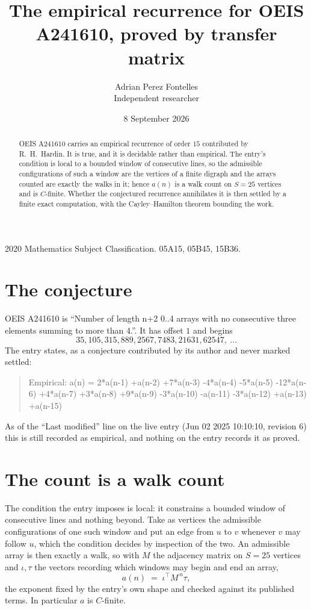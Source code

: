 \documentclass[11pt,a4paper]{article}
\title{The empirical recurrence for OEIS A241610, proved by transfer matrix}
\author{Adrian Perez Fontelles\\ \small Independent researcher}
\date{8 September 2026}
\theoremstyle{plain}
\theoremstyle{definition}
\begin{document}
\maketitle

\begin{abstract}
OEIS A241610 carries an empirical recurrence of order $15$ contributed by R.~H.~Hardin. It is
true, and it is decidable rather than empirical. The entry's condition is local to a bounded window of consecutive lines, so
the admissible configurations of such a window are the vertices of a finite digraph and the
arrays counted are exactly the walks in it; hence $a(n)$ is a walk count on $S=25$ vertices
and is $C$-finite. Whether the conjectured recurrence annihilates it is then settled by a
finite exact computation, with the Cayley--Hamilton theorem bounding the work.
\end{abstract}

\noindent\small 2020 Mathematics Subject Classification. 05A15, 05B45, 15B36.\normalsize

\section{The conjecture}

OEIS A241610 is ``Number of length n+2 0..4 arrays with no consecutive three elements summing to more than 4.''. It has offset $1$ and begins
\[
35, 105, 315, 889, 2567, 7483, 21631, 62547,\ \dots
\]
The entry states, as a conjecture contributed by its author and never marked settled:
\begin{quote}
Empirical: a(n) = 2*a(n-1) +a(n-2) +7*a(n-3) -4*a(n-4) -5*a(n-5) -12*a(n-6) +4*a(n-7) +3*a(n-8) +9*a(n-9) -3*a(n-10) -a(n-11) -3*a(n-12) +a(n-13) +a(n-15)
\end{quote}
As of the ``Last modified'' line on the live entry (Jun 02 2025 10:10:10, revision 6) this is still
recorded as empirical, and nothing on the entry records it as proved.

\section{The count is a walk count}

The condition the entry imposes is local: it constrains a bounded window of consecutive lines and nothing beyond. Take as
vertices the admissible configurations of one such window and put an edge from $u$ to $v$
whenever $v$ may follow $u$, which the condition decides by inspection of the two. An
admissible array is then exactly a walk, so with $M$ the adjacency matrix on $S=25$ vertices
and $\iota,\tau$ the vectors recording which windows may begin and end an array,
\[
a(n)\;=\;\iota^{\!\top}M^{\,n}\tau ,
\]
the exponent fixed by the entry's own shape and checked against its published terms. In
particular $a$ is $C$-finite.
\end{document}
